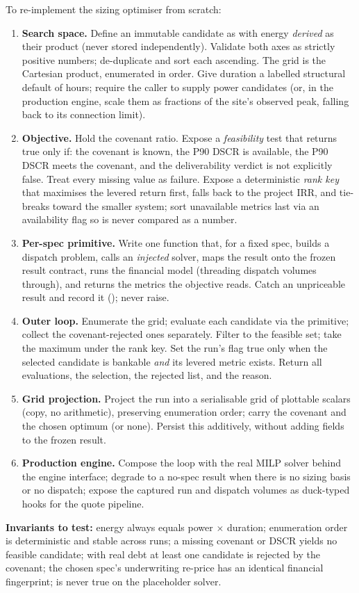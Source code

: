 \begin{rebuild}
To re-implement the sizing optimiser from scratch:
\begin{enumerate}
  \item \textbf{Search space.} Define an immutable candidate as  with energy \emph{derived} as their product (never stored independently). Validate both axes as strictly positive numbers; de-duplicate and sort each ascending. The grid is the Cartesian product, enumerated in  order. Give duration a labelled structural default of  hours; require the caller to supply power candidates (or, in the production engine, scale them as fractions  of the site's observed peak, falling back to its connection limit).
  \item \textbf{Objective.} Hold the covenant ratio. Expose a \emph{feasibility} test that returns true only if: the covenant is known, the P90 DSCR is available, the P90 DSCR meets the covenant, and the deliverability verdict is not explicitly false. Treat every missing value as failure. Expose a deterministic \emph{rank key} that maximises the levered return first, falls back to the project IRR, and tie-breaks toward the smaller system; sort unavailable metrics last via an availability flag so  is never compared as a number.
  \item \textbf{Per-spec primitive.} Write one function that, for a fixed spec, builds a dispatch problem, calls an \emph{injected} solver, maps the result onto the frozen result contract, runs the financial model (threading dispatch volumes through), and returns the metrics the objective reads. Catch an unpriceable result and record it (); never raise.
  \item \textbf{Outer loop.} Enumerate the grid; evaluate each candidate via the primitive; collect the covenant-rejected ones separately. Filter to the feasible set; take the maximum under the rank key. Set the run's  flag true only when the selected candidate is bankable \emph{and} its levered metric exists. Return all evaluations, the selection, the rejected list, and the reason.
  \item \textbf{Grid projection.} Project the run into a serialisable grid of plottable scalars (copy, no arithmetic), preserving enumeration order; carry the covenant and the chosen optimum (or none). Persist this additively, without adding fields to the frozen result.
  \item \textbf{Production engine.} Compose the loop with the real MILP solver behind the engine interface; degrade to a no-spec result when there is no sizing basis or no dispatch; expose the captured run and dispatch volumes as duck-typed hooks for the quote pipeline.
\end{enumerate}
\textbf{Invariants to test:} energy always equals power $\times$ duration; enumeration order is deterministic and stable across runs; a missing covenant or DSCR yields no feasible candidate; with real debt at least one candidate is rejected by the covenant; the chosen spec's underwriting re-price has an identical financial fingerprint;  is never true on the placeholder solver.
\end{rebuild}
